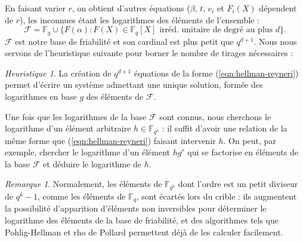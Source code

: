 \documentclass[a4paper, titlepage, 11pt]{article}
\theoremstyle{definition}
\theoremstyle{remark}
\newtheorem{rema}[theo]{Remarque}
\newtheorem{heur}[theo]{Heuristique}
\def\gf #1{\mathbb{F}_{#1}}
\begin{document}
En faisant varier $r$, on obtient d'autres équations ($\beta$, $t$, $e_i$ et $F_i(X)$ dépendent de $r$), les inconnues étant les logarithmes des éléments de l'ensemble :
$$\mathcal{F} =  \gf{q} \cup \{F(\alpha) : F(X) \in \gf{q}[X] \text{ irréd. unitaire de degré au plus } d \}.$$
$\mathcal{F}$ est notre base de friabilité et son cardinal est plus petit que $q^{d+1}$. Nous nous servons de l'heuristique suivante pour borner le nombre de tirages nécessaires :
\begin{heur}
La création de $q^{d+1}$ équations de la forme (\ref{eqn:hellman-reyneri}) permet d'écrire un système admettant une unique solution, formée des logarithmes en base $g$ des éléments de $\mathcal{F}$.
\end{heur}

Une fois que les logarithmes de la base $\mathcal{F}$ sont connus, nous cherchons le logarithme d'un élément arbitraire $h \in \gf{q^k}$ : il suffit d'avoir une relation de la même forme que (\ref{eqn:hellman-reyneri}) faisant intervenir $h$. On peut, par exemple, chercher le logarithme d'un élément $hg^r$ qui se factorise en éléments de la base $\mathcal{F}$ et déduire le logarithme de $h$.

\begin{rema}
Normalement, les éléments de $\gf{q^k}$ dont l'ordre est un petit diviseur de $q^k-1$, comme les éléments de $\gf{q}$, sont écartés lors du crible : ils augmentent la possibilité d'apparition d'éléments non inversibles pour déterminer le logarithme des éléments de la base de friabilité, et des algorithmes tels que Pohlig-Hellman \cite{pohligHellman1978} et rho de Pollard \cite{pollard1978} permettent déjà de les calculer facilement.
\end{rema}
\end{document}
